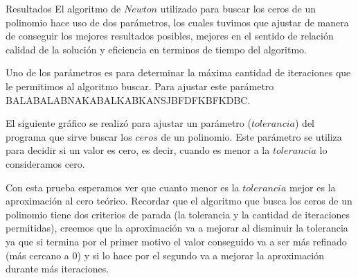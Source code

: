\begin{section}{Resultados}
	El algoritmo de $Newton$ utilizado para buscar los ceros de un polinomio hace uso de dos parámetros, los cuales tuvimos que ajustar de manera de conseguir los mejores resultados posibles, mejores en el sentido de relación calidad de la solución y eficiencia en terminos de tiempo del algoritmo.
	
	Uno de los parámetros es para determinar la máxima cantidad de iteraciones que le permitimos al algoritmo buscar. Para ajustar este parámetro BALABALABNAKABALKABKANSJBFDFKBFKDBC.

	El siguiente gráfico se realizó para ajustar un parámetro ($tolerancia$) del programa que sirve buscar los $ceros$ de un polinomio. Este parámetro se utiliza para decidir si un valor es cero, es decir, cuando es menor a la $tolerancia$ lo consideramos cero.
	
	Con esta prueba esperamos ver que cuanto menor es la $tolerancia$ mejor es la aproximación al cero teórico. Recordar que el algoritmo que busca los ceros de un polinomio tiene dos criterios de parada (la tolerancia y la cantidad de iteraciones permitidas), creemos que la aproximación va a mejorar al disminuir la tolerancia ya que si termina por el primer motivo el valor conseguido va a ser más refinado (más cercano a 0) y si lo hace por el segundo va a mejorar la aproximación durante más iteraciones.
	
\end{section}
